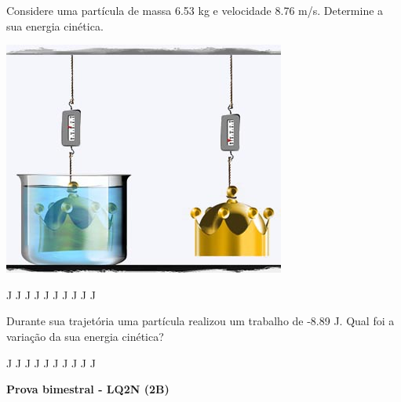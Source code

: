 \documentclass[12pt, addpoints]{exam}
\begin{document}
        \begin{questions}
\begin{multicols*}{2}
\question[33] Considere uma partícula de massa    6.53 kg e velocidade    8.76 m/s. Determine a sua energia cinética.
\begin{center}
\begin{minipage}[c]{0.75\linewidth}
\includegraphics[width=\textwidth]{MWE001.jpg}
\end{minipage}
\end{center}
\begin{oneparchoices}
 J J J J J J J J J J\end{oneparchoices}
\question[23] Durante sua trajetória uma partícula realizou um trabalho de   -8.89 J. Qual foi a variação da sua energia cinética?
\begin{oneparchoices}
 J J J J J J J J J J\end{oneparchoices}
\end{multicols*}
\end{questions}
\newpage
        \begin{minipage}[l]{0.75\linewidth}
            \begin{flushleft}
                {\bf \Large Prova bimestral - LQ2N (2B)}
            \end{flushleft}
        \end{minipage}
\end{document}
